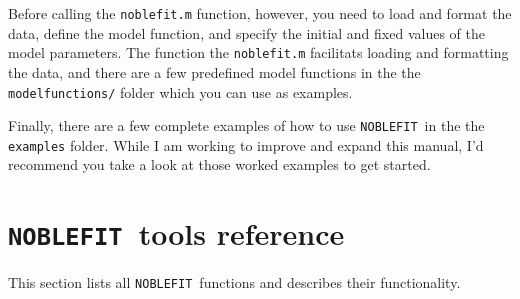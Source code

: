 \documentclass[12pt]{article}
\newcommand{\noblefit}{{\tt NOBLEFIT}}
\begin{document}
Before calling the {\tt noblefit.m} function, however, you need to load and format the data, define the model function, and specify the initial and fixed values of the model parameters. The function the {\tt noblefit.m} facilitats loading and formatting the data, and there are a few predefined model functions in the the {\tt modelfunctions/} folder which you can use as examples. 

Finally, there are a few complete examples of how to use \noblefit\ in the the {\tt examples} folder. While I am working to improve and expand this manual, I'd recommend you take a look at those worked examples to get started.

\section{\noblefit\  tools reference}\label{sec:tools_ref}
This section lists all \noblefit\ functions and describes their functionality.





\end{document}
